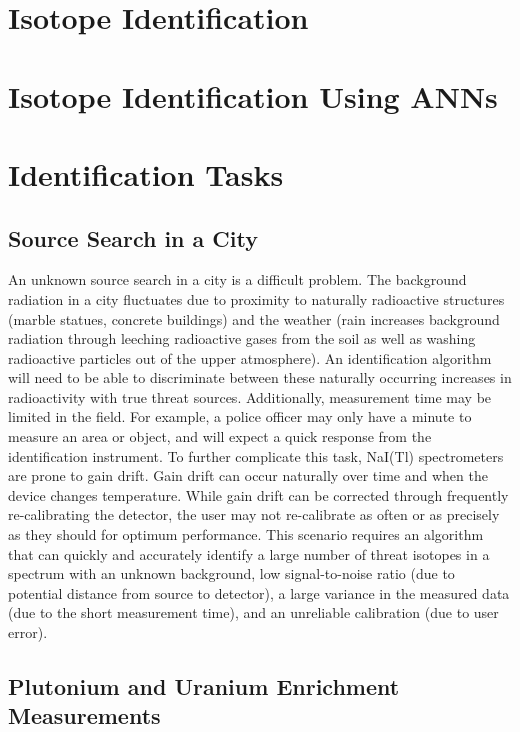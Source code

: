 \documentclass[thesis,tocnosub,noragright,centerchapter,12pt,fullpage]{uiucecethesis09}
\begin{document}
\section{Isotope Identification}




\section{Isotope Identification Using ANNs}




\section{Identification Tasks}

\subsection{Source Search in a City}
An unknown source search in a city is a difficult problem. The background radiation in a city fluctuates due to proximity to naturally radioactive structures (marble statues, concrete buildings) and the weather (rain increases background radiation through leeching radioactive gases from the soil as well as washing radioactive particles out of the upper atmosphere). An identification algorithm will need to be able to discriminate between these naturally occurring increases in radioactivity with true threat sources. Additionally, measurement time may be limited in the field. For example, a police officer may only have a minute to measure an area or object, and will expect a quick response from the identification instrument. To further complicate this task, NaI(Tl) spectrometers are prone to gain drift. Gain drift can occur naturally over time and when the device changes temperature. While gain drift can be corrected through frequently re-calibrating the detector, the user may not re-calibrate as often or as precisely as they should for optimum performance. This scenario requires an algorithm that can quickly and accurately identify a large number of threat isotopes in a spectrum with an unknown background, low signal-to-noise ratio (due to potential distance from source to detector), a large variance in the measured data (due to the short measurement time), and an unreliable calibration (due to user error).

\subsection{Plutonium and Uranium Enrichment Measurements}
\end{document}
